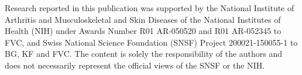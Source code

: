 Research reported in this publication was supported by the National Institute of Arthritis and Musculoskeletal and Skin Diseases of the National Institutes of Health (NIH) under Awards Number R01 AR-050520 and R01 AR-052345 to FVC, and Swiss National Science Foundation (SNSF) Project 200021-150055-1 to BG, KF and FVC. The content is solely the responsibility of the authors and does not necessarily represent the official views of the SNSF or the NIH.
